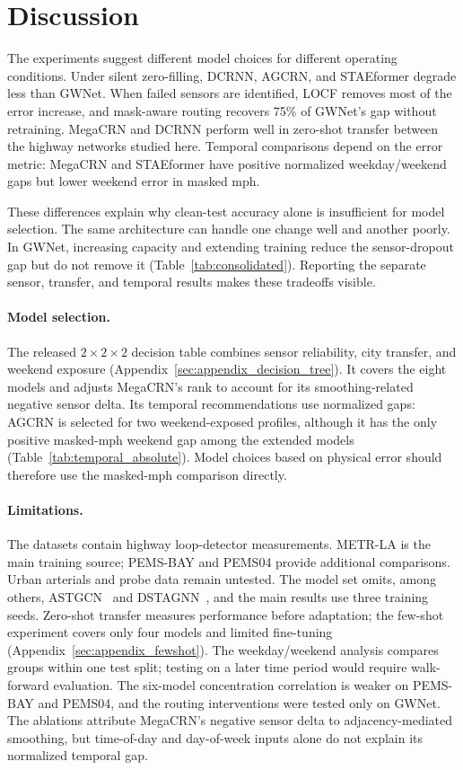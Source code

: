 \section{Discussion}
\label{sec:discussion}

The experiments suggest different model choices for different operating
conditions. Under silent zero-filling, DCRNN, AGCRN, and STAEformer degrade
less than GWNet. When failed sensors are identified, LOCF removes most of
the error increase, and mask-aware routing recovers 75\% of GWNet's gap
without retraining. MegaCRN and DCRNN perform well in zero-shot transfer
between the highway networks studied here. Temporal comparisons depend on
the error metric: MegaCRN and STAEformer have positive normalized
weekday/weekend gaps but lower weekend error in masked mph.

These differences explain why clean-test accuracy alone is insufficient for
model selection. The same architecture can handle one change well and
another poorly. In GWNet, increasing capacity and extending training reduce
the sensor-dropout gap but do not remove it
(Table~\ref{tab:consolidated}). Reporting the separate sensor, transfer,
and temporal results makes these tradeoffs visible.

\paragraph{Model selection.}
The released $2{\times}2{\times}2$ decision table combines sensor reliability,
city transfer, and weekend exposure
(Appendix~\ref{sec:appendix_decision_tree}). It covers the eight models and
adjusts MegaCRN's rank to account for its smoothing-related negative sensor
delta. Its temporal recommendations use normalized gaps: AGCRN is selected
for two weekend-exposed profiles, although it has the only positive
masked-mph weekend gap among the extended models
(Table~\ref{tab:temporal_absolute}). Model choices based on physical error
should therefore use the masked-mph comparison directly.

\paragraph{Limitations.}
The datasets contain highway loop-detector measurements. METR-LA is the
main training source; PEMS-BAY and PEMS04 provide additional comparisons.
Urban arterials and probe data remain untested. The model set omits, among
others, ASTGCN~\citep{guo2019astgcn} and DSTAGNN~\citep{lan2022dstagnn},
and the main results use three training seeds. Zero-shot transfer measures
performance before adaptation; the few-shot experiment covers only four
models and limited fine-tuning (Appendix~\ref{sec:appendix_fewshot}).
The weekday/weekend analysis compares groups within one test split;
testing on a later time period would require walk-forward evaluation.
The six-model concentration correlation is weaker on PEMS-BAY and PEMS04,
and the routing interventions were tested only on GWNet. The ablations
attribute MegaCRN's negative sensor delta to adjacency-mediated smoothing,
but time-of-day and day-of-week inputs alone do not explain its normalized
temporal gap.

